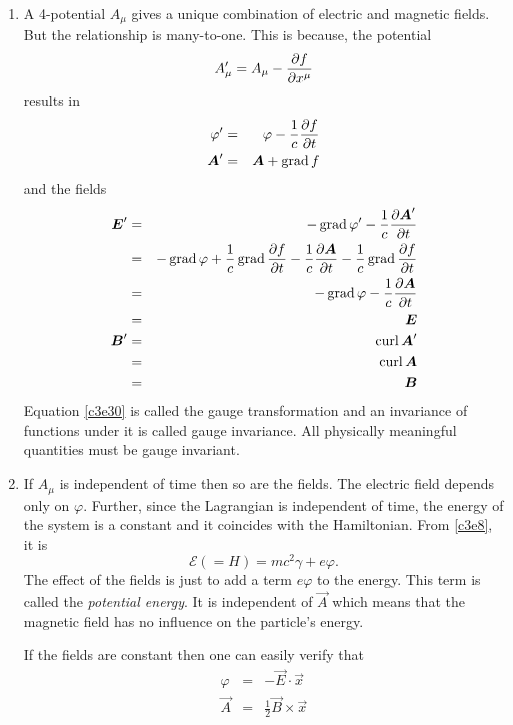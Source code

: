 \begin{enumerate}
\item A 4-potential $A_\mu$ gives a unique combination of electric and magnetic
fields. But the relationship is many-to-one. This is because, the potential
\begin{equation}\label{c3e30}
A_\mu^\prime = A_\mu - \frac{\partial{f}}{\partial{x^\mu}}
\end{equation}
results in
\begin{eqnarray}
\varphi^\prime &=& \varphi - \frac{1}{c}\frac{\partial{f}}{\partial{t}} \label{c3e31} \\
\boldsymbol{A}^\prime &=& \boldsymbol{A} + \operatorname{grad} f \label{c3e32}
\end{eqnarray}
and the fields
\begin{eqnarray}
\boldsymbol{E}^\prime &=& -\operatorname{grad}{\varphi^\prime} - \frac{1}{c}\frac{\partial{\boldsymbol{A}^\prime}}{\partial{t}} \nonumber \\
 &=& -\operatorname{grad}\varphi + \frac{1}{c}\operatorname{grad}\frac{\partial{f}}{\partial{t}} - 
      \frac{1}{c}\frac{\partial{\boldsymbol{A}}}{\partial{t}} - \frac{1}{c}\operatorname{grad}{\frac{\partial{f}}{\partial{t}}} \nonumber \\
 &=& -\operatorname{grad}\varphi - \frac{1}{c}\frac{\partial{\boldsymbol{A}}}{\partial{t}} \nonumber \\
 &=& \boldsymbol{E} \label{c3e33} \\
\boldsymbol{B}^\prime &=& \operatorname{curl}\boldsymbol{A}^\prime \nonumber \\
 &=& \operatorname{curl}\boldsymbol{A} \nonumber \\
 &=& \boldsymbol{B} \label{c3e34}
\end{eqnarray}
Equation \eqref{c3e30} is called the gauge transformation and an invariance of
functions under it is called gauge invariance. All physically meaningful quantities
must be gauge invariant.

\item If $A_\mu$ is independent of time then so are the fields. The electric field
depends only on $\varphi$. Further, since the Lagrangian is independent of time, the
energy of the system is a constant and it coincides with the Hamiltonian. From
\eqref{c3e8}, it is
\begin{equation}\label{c3e35}
\mathcal{E} (= H) = mc^2\gamma + e\varphi.
\end{equation} 
The effect of the fields is just to add a term $e\varphi$ to the energy. This term
is called the \emph{potential energy}. It is independent of $\vec{A}$ which means
that the magnetic field has no influence on the particle's energy.

If the fields are constant then one can easily verify that
\begin{eqnarray}
\varphi &=& -\vec{E}\cdot\vec{x} \label{c3e36} \\
\vec{A} &=& \frac{1}{2}\vec{B} \times \vec{x} \label{c3e37}
\end{eqnarray}
\end{enumerate}

